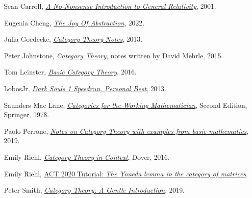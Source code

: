 \begin{thebibliography}{100}
\parskip 0pt
\small
{} Sean Carroll,
\href{https://preposterousuniverse.com/wp-content/uploads/2015/08/grtinypdf.pdf}{\it A
No-Nonsense Introduction to General Relativity},  2001.

 Eugenia Cheng, \href{https://www.cambridge.org/core/books/joy-of-abstraction/00D9AFD3046A406CB85D1AFF5450E657}
{\it The Joy Of Abstraction}, 2022.

 Julia Goedecke,
\href{http://www.julia-goedecke.de/pdf/CategoryTheoryNotes.pdf}{\it Category Theory
Notes}, 2013.

 Peter Johnstone,
\href{http://pi.math.cornell.edu/~dmehrle/notes/partiii/cattheory_partiii_notes.pdf}{\it
Category Theory}, notes written by David Mehrle, 2015.

 Tom Leinster, \href{https://arxiv.org/abs/1612.09375}{\it Basic Category
Theory}, 2016.

 LobosJr, \href{https://www.youtube.com/watch?v=ImMOdTxtf-s}{\it Dark Souls
1 Speedrun, Personal Best}, 2013.

 Saunders Mac Lane,
\href{https://link.springer.com/book/10.1007%2F978-1-4757-4721-8}{\it Categories for the
Working Mathematician}, Second Edition, Springer, 1978.

 Paolo Perrone, \href{https://arxiv.org/abs/1912.10642}{\it Notes on
Category Theory with examples from basic mathematics}, 2019.

 Emily Riehl, \href{https://math.jhu.edu/~eriehl/context/}{\it Category
Theory in Context}, Dover, 2016.

 Emily Riehl, \href{https://www.youtube.com/watch?v=SsgEvrDFJsM}{ACT
2020 Tutorial: {\it The Yoneda lemma in the category of matrices}}.

 Peter Smith,
\href{https://www.logicmatters.net/2018/01/29/category-theory-a-gentle-introduction/}{\it
Category Theory: A Gentle Introduction}, 2019.

\end{thebibliography}